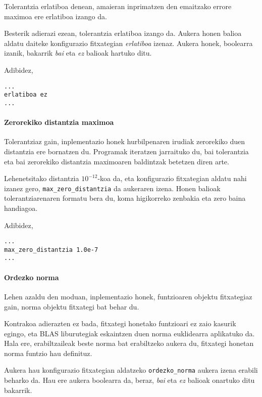 \documentclass[10pt,a4paper,basque]{article}
\begin{document}
Tolerantzia erlatiboa denean, amaieran inprimatzen den emaitzako errore maximoa ere erlatiboa izango da.

Besterik adierazi ezean, tolerantzia erlatiboa izango da. Aukera honen balioa aldatu daiteke konfigurazio fitxategian \emph{erlatiboa} izenaz. Aukera honek, boolearra izanik, bakarrik \emph{bai} eta \emph{ez} balioak hartuko ditu.

Adibidez,

\begin{lstlisting}
...
erlatiboa ez
...
\end{lstlisting}

\paragraph{Zerorekiko distantzia maximoa}

Tolerantziaz gain, inplementazio honek hurbilpenaren irudiak zerorekiko duen distantzia ere bornatzen du. Programak iteratzen jarraituko du, bai tolerantzia eta bai zerorekiko distantzia maximoaren baldintzak betetzen diren arte.

Lehenetsitako distantzia $10^{-12}$-koa da, eta konfigurazio fitxategian aldatu nahi izanez gero, \verb|max_zero_distantzia| da aukeraren izena. Honen balioak tolerantziarenaren formatu bera du, koma higikorreko zenbakia eta zero baina handiagoa.

Adibidez,

\begin{lstlisting}
...
max_zero_distantzia 1.0e-7
...
\end{lstlisting}

\paragraph{Ordezko norma}

Lehen azaldu den moduan, inplementazio honek, funtzioaren objektu fitxategiaz gain, norma objektu fitxategi bat behar du.

Kontrakoa adierazten ez bada, fitxategi honetako funtzioari ez zaio kasurik egingo, eta BLAS liburutegiak eskaintzen duen norma euklidearra aplikatuko da. Hala ere, erabiltzaileak beste norma bat erabiltzeko aukera du, fitxategi honetan norma funtzio hau definituz.

Aukera hau konfigurazio fitxategian aldatzeko \verb|ordezko_norma| aukera izena erabili beharko da. Hau ere aukera boolearra da, beraz, \emph{bai} eta \emph{ez} balioak onartuko ditu bakarrik.
\end{document}
